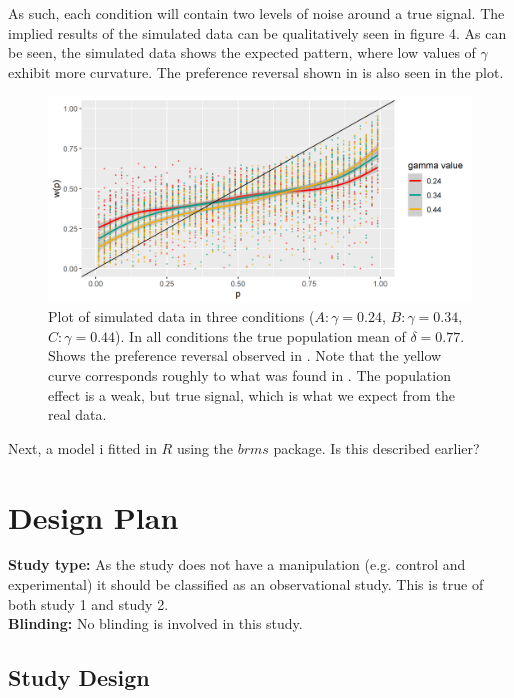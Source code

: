 \documentclass[12pt]{article}
\begin{document}
As such, each condition will contain
two levels of noise around a true signal.
The implied results of the simulated data
can be qualitatively seen in figure 4.
As can be seen, the simulated data shows
the expected pattern, where low values of
$\gamma$ exhibit more curvature. The preference
reversal shown in \textcite{rottenstreich2001money}
is also seen in the plot.

\begin{figure}[h!]
	\includegraphics[width = \linewidth]
	{../Figures/simulated.png}
	\caption{Plot of simulated data in three
		conditions ($A: \gamma = 0.24$,
		$B: \gamma = 0.34$,
		$C: \gamma = 0.44$). In all conditions
		the true population mean of
		$\delta = 0.77$. Shows the preference
		reversal observed in
	\textcite{rottenstreich2001money}. Note
	that the yellow curve corresponds
	roughly to what was found in
	\textcite{gonzalez1999shape}.
	The population effect is a
	weak, but true signal, which is
what we expect from the real data.}
	\end{figure}

Next, a model i fitted in $R$ using the
 $brms$ package. Is this described earlier?


\section{Design Plan}

\textbf{Study type:} As the study does not have
a manipulation (e.g. control and experimental)
it should be classified as an observational study.
This is true of both study 1 and study 2. \\

\textbf{Blinding:} No blinding is involved in this study. \\

\subsection{Study Design}
\end{document}
